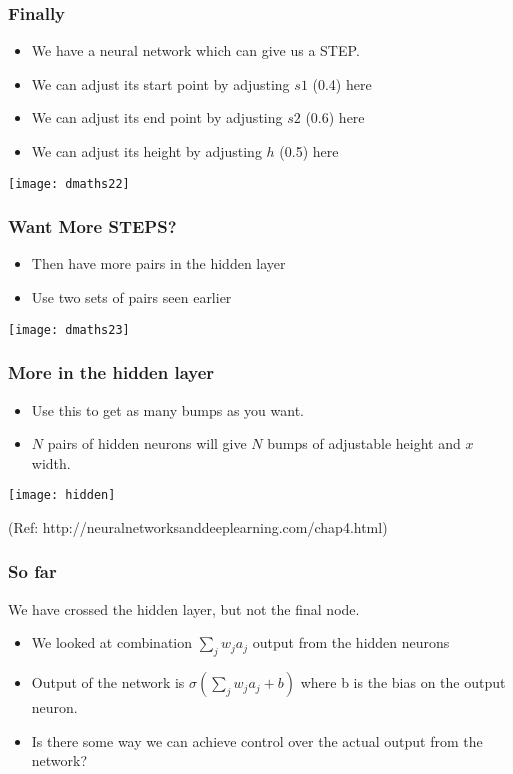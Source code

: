\begin{frame}[fragile] \frametitle{Finally}
\begin{itemize}
\item We have a neural network which can give us a STEP.
\item We can adjust its start point by adjusting $s1$ (0.4) here
\item We can adjust its end point by adjusting $s2$ (0.6) here
\item We can adjust its height by adjusting $h$ (0.5) here
\end{itemize}
\begin{center}
\texttt{[image: dmaths22]}
\end{center}
\end{frame}


\begin{frame}[fragile] \frametitle{Want More STEPS?}

\begin{itemize}
\item Then have more pairs in the hidden layer
\item Use two sets of pairs seen earlier
\end{itemize}
\begin{center}
\texttt{[image: dmaths23]}
\end{center}

\end{frame}

\begin{frame}[fragile] \frametitle{More in the hidden layer}
\begin{itemize}
\item Use this to get as many bumps as you want.
\item $N$ pairs of hidden neurons will give $N$ bumps of adjustable height and $x$ width.
\end{itemize}

\begin{center}
\texttt{[image: hidden]}
\end{center}
{\tiny (Ref: http://neuralnetworksanddeeplearning.com/chap4.html)}
\end{frame}


\begin{frame}[fragile] \frametitle{So far}
We have crossed the hidden layer, but not the final node.
\begin{itemize}
\item We looked at combination $\sum_j w_j a_j$ output from the hidden neurons
\item Output of the network is $\sigma(\sum_j w_j a_j + b)$ where b is the bias on the output neuron. 
\item Is there some way we can achieve control over the actual output from the network?
\end{itemize}

\end{frame}

